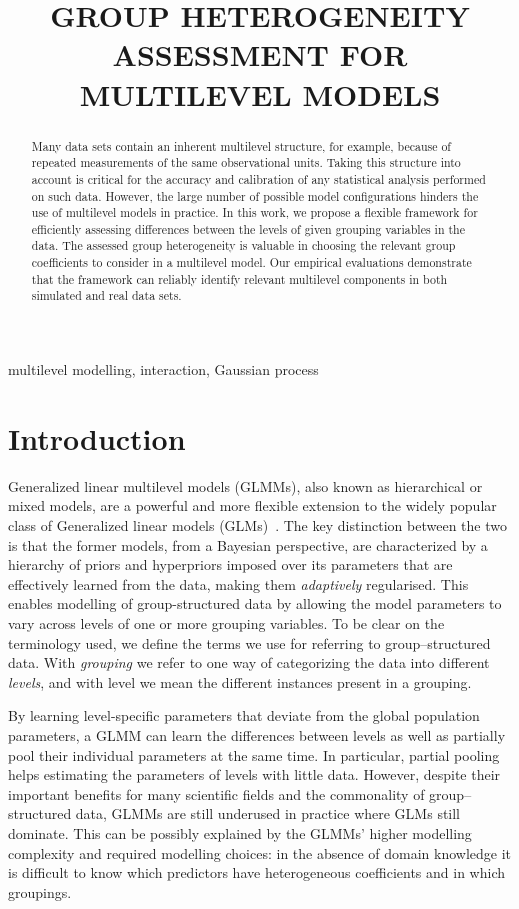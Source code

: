 \documentclass{article}
\title{GROUP HETEROGENEITY ASSESSMENT FOR MULTILEVEL MODELS}
\begin{document}
%
%
\maketitle
%
\begin{abstract}
Many data sets contain an inherent multilevel structure, for example, because of repeated measurements of the same observational units.  Taking this structure into account
is critical for the accuracy and calibration
of any statistical analysis performed on such data.
However, the large number of possible model configurations hinders
the use of multilevel models in practice. In this work, we propose a flexible framework for
efficiently assessing differences between the levels of given grouping variables in the data.
The assessed group heterogeneity is valuable in choosing the relevant
group coefficients to consider in a multilevel model.
%
Our empirical evaluations demonstrate that the framework can reliably identify
relevant multilevel components in both simulated and real data sets.
\end{abstract}
%
\begin{keywords}
multilevel modelling, interaction, Gaussian process
\end{keywords}
%
\section{Introduction}
\label{sec:intro}

Generalized linear multilevel models (GLMMs), also known as hierarchical or mixed models, are a powerful and more flexible extension to the widely popular class of Generalized linear models (GLMs)~\cite{mcculloch2005generalized,gelman2006data}.
The key distinction between the two is that the former models, from a Bayesian perspective, are characterized by a hierarchy of priors and hyperpriors imposed over its parameters that are effectively learned from the data, making them \emph{adaptively} regularised.
%
This enables modelling of group-structured data by allowing the model parameters to vary across levels of one or more grouping variables.
To be clear on the terminology used, we define the terms we use for referring to group--structured data.
With \emph{grouping} we refer to one way of categorizing the data into different \emph{levels}, and with
level we mean the different instances present in a grouping.


By learning level-specific parameters that deviate from the global population parameters, a GLMM
can learn the differences between levels as well as partially pool their individual parameters at the same time. In particular, partial pooling helps estimating
the parameters of levels with little data.
However, despite their important benefits for many scientific fields and the commonality of group--structured data, GLMMs are still underused in practice where GLMs still dominate.
This can be possibly explained by the GLMMs' higher modelling complexity and required modelling choices: in the absence of domain knowledge
%
it is difficult to know which predictors have heterogeneous coefficients and in
which groupings.
%
\end{document}

